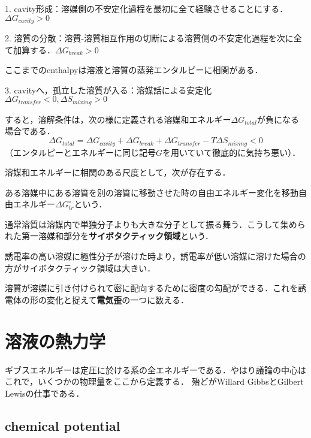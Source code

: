 \documentclass[uplatex, dvipdfmx]{jsreport}
\begin{document}
\begin{theory}
    1. cavity形成：溶媒側の不安定化過程を最初に全て経験させることにする．$\Delta G_{cavity}>0$

    2. 溶質の分散：溶質-溶質相互作用の切断による溶質側の不安定化過程を次に全て加算する．$\Delta G_{break}>0$

    ここまでのenthalpyは溶液と溶質の蒸発エンタルピーに相関がある．

    3. cavityへ，孤立した溶質が入る：溶媒話による安定化$\Delta G_{transfer}<0, \Delta S_{mixing}>0$

    すると，溶解条件は，次の様に定義される溶媒和エネルギー$\Delta G_{total}$が負になる場合である．
    \[ \Delta G_{total} = \Delta G_{cavity} + \Delta G_{break} + \Delta G_{transfer} - T\Delta S_{mixing} < 0 \]
    （エンタルピーとエネルギーに同じ記号$G$を用いていて徹底的に気持ち悪い）．
\end{theory}
溶媒和エネルギーに相関のある尺度として，次が存在する．
\begin{definition}
    ある溶媒中にある溶質を別の溶質に移動させた時の自由エネルギー変化を移動自由エネルギー$\Delta G^\circ_{tr}$という．
\end{definition}

\begin{definition}
    通常溶質は溶媒内で単独分子よりも大きな分子として振る舞う．こうして集められた第一溶媒和部分を\textbf{サイボタクティック領域}という．

    誘電率の高い溶媒に極性分子が溶けた時より，誘電率が低い溶媒に溶けた場合の方がサイボタクティック領域は大きい．
\end{definition}
\begin{definition}[electrostriction]
    溶質が溶媒に引き付けられて密に配向するために密度の勾配ができる．これを誘電体の形の変化と捉えて\textbf{電気歪}の一つに数える．
\end{definition}

\section{溶液の熱力学}
ギブスエネルギーは定圧に於ける系の全エネルギーである．やはり議論の中心はこれで，いくつかの物理量をここから定義する．
殆どがWillard GibbsとGilbert Lewisの仕事である．

\subsection{chemical potential}
\end{document}
